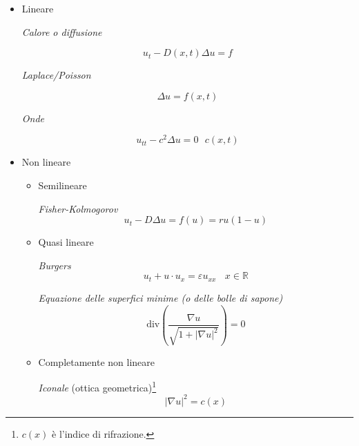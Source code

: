 \begin{itemize}
    \item Lineare

          \textit{Calore o diffusione}

          \begin{equation*}
              u_{t} -D(x,t) \Delta u=f
          \end{equation*}

          \textit{Laplace/Poisson}

          \begin{equation*}
              \Delta u=f(x,t)
          \end{equation*}

          \textit{Onde}

          \begin{equation*}
              u_{tt} -c^{2} \Delta u=0\ \ \ c(x,t)
          \end{equation*}
    \item Non lineare
          \begin{itemize}
              \item Semilineare

                    \textit{Fisher-Kolmogorov}
                    \begin{equation*}
                        u_{t} -D\Delta u=f(u) =ru(1-u)
                    \end{equation*}
              \item Quasi lineare

                    \textit{Burgers}
                    \begin{equation*}
                        u_{t} +u\cdotp u_{x} =\varepsilon u_{xx} \ \ \ \ x\in \mathbb{R}
                    \end{equation*}

                    \textit{Equazione delle superfici minime (o delle bolle di sapone)}
                    \begin{equation*}
                        \mathrm{div}\left(\frac{\nabla u}{\sqrt{1+| \nabla u| ^{2}}}\right) =0
                    \end{equation*}
              \item Completamente non lineare

                    \textit{Iconale} (ottica geometrica)\footnote{$c(x)$ è l'indice di rifrazione.}
                    \begin{equation*}
                        | \nabla u| ^{2} =c(x)
                    \end{equation*}


\end{itemize}
\end{itemize}
